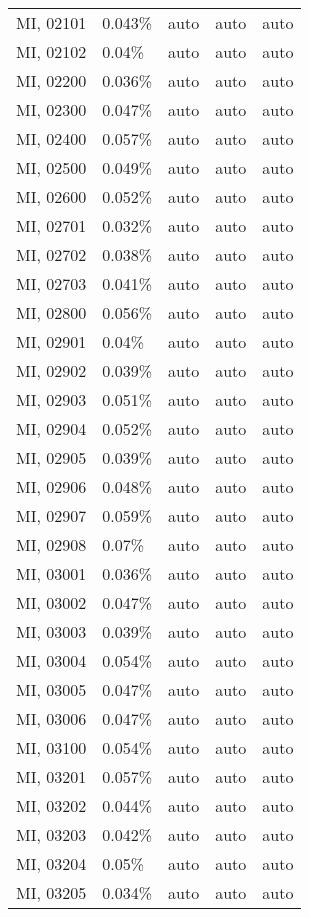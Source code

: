 \begin{longtable}[]{@{}lllll@{}}
MI, 02101 & 0.043\% & auto & auto & auto \\
MI, 02102 & 0.04\% & auto & auto & auto \\
MI, 02200 & 0.036\% & auto & auto & auto \\
MI, 02300 & 0.047\% & auto & auto & auto \\
MI, 02400 & 0.057\% & auto & auto & auto \\
MI, 02500 & 0.049\% & auto & auto & auto \\
MI, 02600 & 0.052\% & auto & auto & auto \\
MI, 02701 & 0.032\% & auto & auto & auto \\
MI, 02702 & 0.038\% & auto & auto & auto \\
MI, 02703 & 0.041\% & auto & auto & auto \\
MI, 02800 & 0.056\% & auto & auto & auto \\
MI, 02901 & 0.04\% & auto & auto & auto \\
MI, 02902 & 0.039\% & auto & auto & auto \\
MI, 02903 & 0.051\% & auto & auto & auto \\
MI, 02904 & 0.052\% & auto & auto & auto \\
MI, 02905 & 0.039\% & auto & auto & auto \\
MI, 02906 & 0.048\% & auto & auto & auto \\
MI, 02907 & 0.059\% & auto & auto & auto \\
MI, 02908 & 0.07\% & auto & auto & auto \\
MI, 03001 & 0.036\% & auto & auto & auto \\
MI, 03002 & 0.047\% & auto & auto & auto \\
MI, 03003 & 0.039\% & auto & auto & auto \\
MI, 03004 & 0.054\% & auto & auto & auto \\
MI, 03005 & 0.047\% & auto & auto & auto \\
MI, 03006 & 0.047\% & auto & auto & auto \\
MI, 03100 & 0.054\% & auto & auto & auto \\
MI, 03201 & 0.057\% & auto & auto & auto \\
MI, 03202 & 0.044\% & auto & auto & auto \\
MI, 03203 & 0.042\% & auto & auto & auto \\
MI, 03204 & 0.05\% & auto & auto & auto \\
MI, 03205 & 0.034\% & auto & auto & auto \\

\end{longtable}
